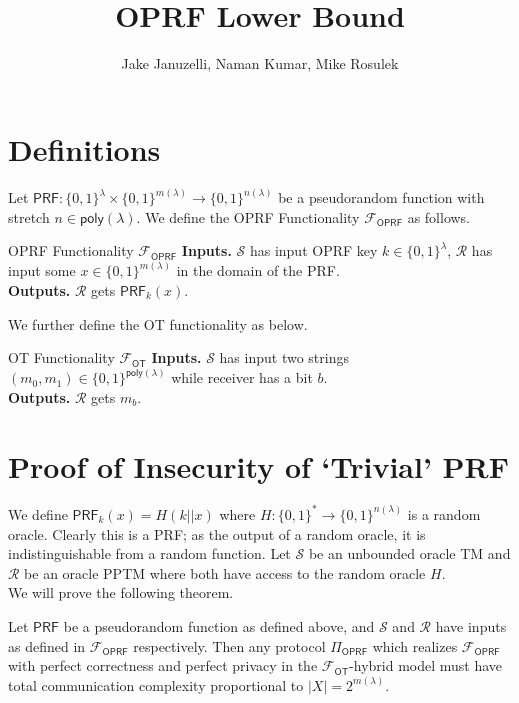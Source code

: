 \documentclass[10pt,a4paper]{article}
\title{\textbf{OPRF Lower Bound}}
\author{Jake Januzelli, Naman Kumar, Mike Rosulek}
\newcommand{\F}{\mathcal{F}}
\newcommand{\poly}{\mathsf{poly}}
\newcommand{\oprf}{\mathsf{OPRF}}
\newcommand{\prf}{\mathsf{PRF}}
\newcommand{\bin}{\{0,1\}}
\newcommand{\secpar}{\lambda}
\newcommand{\sender}{\mathcal{S}}
\newcommand{\receiver}{\mathcal{R}}
\newcommand{\ot}{\mathsf{OT}}
\begin{document}
	\maketitle

\section{Definitions}

Let $\prf:\bin^\secpar\times\bin^{m(\secpar)}\rightarrow\bin^{n(\secpar)}$ be a pseudorandom function with stretch $n\in\poly(\secpar)$. We define the OPRF Functionality $\F_\oprf$ as follows.

\begin{funcbox}{OPRF Functionality $\F_\oprf$}{}{}
	\textbf{Inputs.} $\sender$ has input OPRF key $k\in\bin^\secpar$, $\receiver$ has input some $x\in\bin^{m(\secpar)}$ in the domain of the PRF.\\
	\textbf{Outputs.} $\receiver$ gets $\prf_k(x)$.
\end{funcbox}

We further define the OT functionality as below.

\begin{funcbox}{OT Functionality $\F_\ot$}{}{}
	\textbf{Inputs.} $\sender$ has input two strings $(m_0, m_1)\in\bin^{\poly(\secpar)}$ while receiver has a bit $b$.\\
	\textbf{Outputs.} $\receiver$ gets $m_b$.
\end{funcbox}

\section{Proof of Insecurity of `Trivial' PRF}
We define $\prf_k(x) = H(k || x)$ where $H:\bin^{*}\rightarrow\bin^{n(\secpar)}$ is a random oracle. Clearly this is a PRF; as the output of a random oracle, it is indistinguishable from a random function. Let $\sender$ be an unbounded oracle TM and $\receiver$ be an oracle PPTM where both have access to the random oracle $H$. \\

We will prove the following theorem.

\begin{theorem}
	Let $\prf$ be a pseudorandom function as defined above, and $\sender$ and $\receiver$ have inputs as defined in $\F_\oprf$ respectively. Then any protocol $\Pi_\oprf$ which realizes $\F_\oprf$ with perfect correctness and perfect privacy in the $\F_\ot$-hybrid model must have total communication complexity proportional to $|X| =2^{m(\secpar)}$.
\end{theorem}
\end{document}

